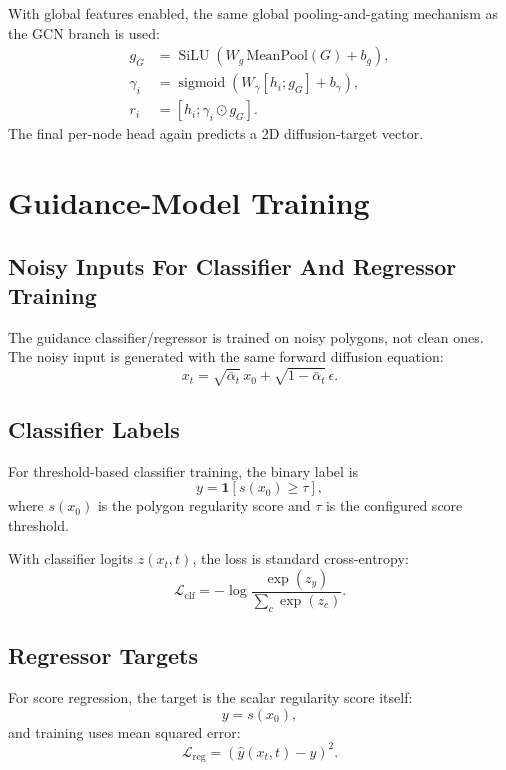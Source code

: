 \documentclass[11pt]{article}
\newcommand{\sigmoid}{\operatorname{sigmoid}}
\newcommand{\SiLU}{\operatorname{SiLU}}
\begin{document}
With global features enabled, the same global pooling-and-gating mechanism as the GCN branch is used:
\begin{align}
g_G &= \SiLU\!\left(W_g\,\mathrm{MeanPool}(G) + b_g\right), \\
\gamma_i &= \sigmoid\!\left(W_\gamma [h_i ; g_G] + b_\gamma\right), \\
r_i &= [h_i ; \gamma_i \odot g_G].
\end{align}
The final per-node head again predicts a 2D diffusion-target vector.

\section{Guidance-Model Training}
\subsection{Noisy Inputs For Classifier And Regressor Training}
The guidance classifier/regressor is trained on noisy polygons, not clean ones. The noisy input is generated with the same forward diffusion equation:
\begin{equation}
x_t = \sqrt{\bar{\alpha}_t}\,x_0 + \sqrt{1-\bar{\alpha}_t}\,\epsilon.
\end{equation}

\subsection{Classifier Labels}
For threshold-based classifier training, the binary label is
\begin{equation}
y =
\mathbf{1}\!\left[s(x_0) \ge \tau\right],
\end{equation}
where $s(x_0)$ is the polygon regularity score and $\tau$ is the configured score threshold.

With classifier logits $z(x_t,t)$, the loss is standard cross-entropy:
\begin{equation}
\mathcal{L}_{\mathrm{clf}}
=
- \log
\frac{\exp(z_y)}{\sum_c \exp(z_c)}.
\end{equation}

\subsection{Regressor Targets}
For score regression, the target is the scalar regularity score itself:
\begin{equation}
y = s(x_0),
\end{equation}
and training uses mean squared error:
\begin{equation}
\mathcal{L}_{\mathrm{reg}} = \left(\hat{y}(x_t,t) - y\right)^2.
\end{equation}
\end{document}

